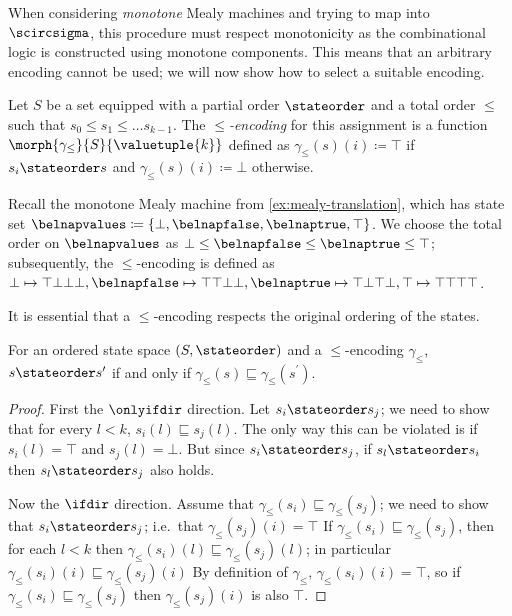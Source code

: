 When considering \emph{monotone} Mealy machines and trying to map into
\(\scircsigma\), this procedure must respect monotonicity as the combinational
logic is constructed using monotone components.
This means that an arbitrary encoding cannot be used; we will now show how to
select a suitable encoding.

\begin{definition}[Encoding]\label{def:encoding}
    Let \(S\) be a set equipped with a partial order \(\stateorder\) and a total
    order \(\leq\) such that \(s_0 \leq s_1 \leq \dots s_{k-1}\).
    The \emph{\(\leq\)-encoding} for this assignment is a function
    \(\morph{\gamma_\leq}{S}{\valuetuple{k}}\) defined as
    \(\gamma_\leq(s)(i) \coloneqq \top\) if \(s_i \stateorder s\) and
    \(\gamma_\leq(s)(i) \coloneqq \bot\) otherwise.
\end{definition}

\begin{example}
    Recall the monotone Mealy machine from \cref{ex:mealy-translation}, which
    has state set \(
    \belnapvalues \coloneqq \{\bot,\belnapfalse,\belnaptrue,\top\}
    \).
    We choose the total order on \(\belnapvalues\) as
    \(\bot \leq \belnapfalse \leq \belnaptrue \leq \top\); subsequently, the
    \(\leq\)-encoding is defined as \(
    \bot \mapsto \top\bot\bot\bot, \belnapfalse \mapsto \top\top\bot\bot,
    \belnaptrue \mapsto \top\bot\top\bot, \top \mapsto \top\top\top\top
    \).
\end{example}

It is essential that a \(\leq\)-encoding respects the original ordering of the
states.

\begin{lemma}
    For an ordered state space \((S,\stateorder)\) and a \(\leq\)-encoding
    \(\gamma_\leq\), \(s \stateorder s^\prime\) if and only if
    \(\gamma_\leq(s) \sqsubseteq \gamma_\leq(s^\prime)\).
\end{lemma}
\begin{proof}
    First the \(\onlyifdir\) direction.
    Let \(s_i \stateorder s_j\); we need to show that for every \(l < k\),
    \(s_i(l) \sqsubseteq s_j(l)\).
    The only way this can be violated is if \(s_i(l) = \top\) and
    \(s_j(l) = \bot\).
    But since \(s_i \stateorder s_j\), if \(s_l \stateorder s_i\) then
    \(s_l \stateorder s_j\) also holds.

    Now the \(\ifdir\) direction.
    Assume that \(\gamma_\leq(s_i) \sqsubseteq \gamma_\leq(s_j)\); we need to
    show that \(s_i \stateorder s_j\); i.e.\ that \(\gamma_\leq(s_j)(i) = \top\)
    If \(\gamma_\leq(s_i) \sqsubseteq \gamma_\leq(s_j)\), then for each
    \(l < k\) then \(\gamma_\leq(s_i)(l) \sqsubseteq \gamma_\leq(s_j)(l)\);
    in particular \(\gamma_\leq(s_i)(i) \sqsubseteq \gamma_\leq(s_j)(i)\)
    By definition of \(\gamma_\leq\), \(\gamma_\leq(s_i)(i) = \top\), so if
    \(\gamma_\leq(s_i) \sqsubseteq \gamma_\leq(s_j)\) then
    \(\gamma_\leq(s_j)(i)\) is also \(\top\).
\end{proof}

